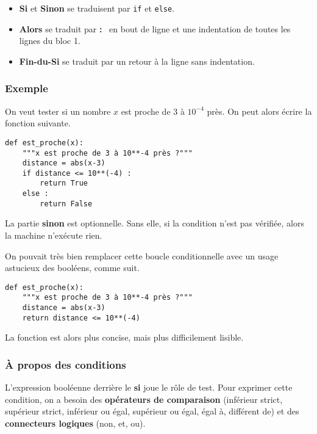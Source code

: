  \begin{itemize}
 \item \textbf{Si} et \textbf{Sinon} se traduisent par \texttt{if} et \texttt{else}. 
 
 \item \textbf{Alors} se traduit par \og \textbf{:} \fg\ en bout de ligne et une indentation de toutes les 
lignes du bloc 1.
 
 \item \textbf{Fin-du-Si} se traduit par un retour à la ligne sans indentation. 
 
 \end{itemize}

 
\subsubsection{Exemple}

On veut tester si un nombre $x$ est proche de 3 à $10^{-4}$ près. On peut alors écrire la fonction suivante. 

\begin{lstlisting}
def est_proche(x):
    """x est proche de 3 à 10**-4 près ?"""
    distance = abs(x-3)
    if distance <= 10**(-4) : 
        return True 
    else : 
        return False
\end{lstlisting}



\begin{remarque} 
La partie \textbf{sinon} est optionnelle. Sans elle, si la condition n'est pas vérifiée, alors la 
machine n'exécute rien.
\end{remarque}

\begin{remarque}
  On pouvait très bien remplacer cette boucle conditionnelle avec un usage astucieux des booléens, comme suit.
\begin{lstlisting}
def est_proche(x):
    """x est proche de 3 à 10**-4 près ?"""
    distance = abs(x-3)
    return distance <= 10**(-4)
\end{lstlisting}
La fonction est alors plus concise, mais plus difficilement lisible. 
\end{remarque}


\subsubsection{\`A propos des conditions}

L'expression booléenne derrière le \textbf{si} joue le rôle de test. Pour exprimer cette condition, 
on a besoin des \textbf{opérateurs de comparaison} (inférieur strict, supérieur strict, inférieur ou 
égal, supérieur ou égal, égal à, différent de) et des \textbf{connecteurs logiques}
(non, et, ou).

